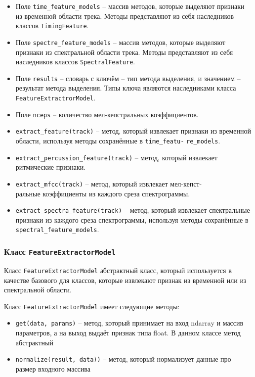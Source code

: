 \begin{itemize}
\item{Поле \texttt{time\_feature\_models} -- массив методов, которые выделяют признаки из временной области трека. Методы представляют из себя наследников классов \texttt{TimingFeature}.}
\item{Поле \texttt{spectre\_feature\_models} -- массив методов, которые выделяют признаки из спектральной области трека. Методы представляют из себя наследников классов \texttt{SpectralFeature}.}
\item{Поле \texttt{results} -- словарь с ключём -- тип метода выделения, и значением -- результат метода выделения. Типы ключа являются наследниками класса \texttt{FeatureExtractrorModel}. }
\item{Поле \texttt{nceps} -- количество мел-кепстральных коэффициентов.}
\item{\texttt{extract\_feature(track)} -- метод, который извлекает признаки из временной области, используя методы сохранённые в \texttt{time\_featu-}   \texttt{re\_models}.}
\item{\texttt{extract\_percussion\_feature(track)} -- метод, который извлекает ритмические признаки.}
\item{\texttt{extract\_mfcc(track)} -- метод, который извлекает мел-кепст- \\ ральные коэффициенты из каждого среза спектрограммы. }
\item{\texttt{extract\_spectra\_feature(track)} -- метод, который извлекает спектральные признаки из каждого среза спектрограммы, используя методы сохранённые в \texttt{spectral\_feature\_models}.}
\end{itemize}

\subsubsection{Класс \texttt{FeatureExtractorModel}}

Класс \texttt{FeatureExtractorModel} абстрактный класс, который используется в качестве базового для классов, которые извлекают признак из временной или из спектральной области.

Класс \texttt{FeatureExtractorModel} имеет следующие методы:

\begin{itemize}
\item{\texttt{get(data, params)} -- метод, который принимает на вход ndarray и массив параметров, а на выход выдаёт признак типа float. В данном классе метод абстрактный }
\item{\texttt{normalize(result, data))} -- метод, который нормализует данные про размер входного массива}
\end{itemize}



